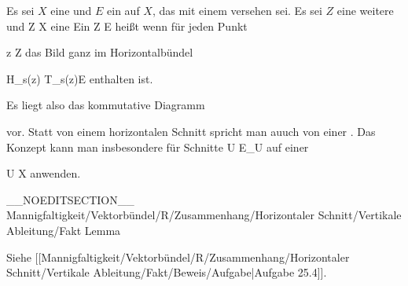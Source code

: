 \setcounter{section}{25}


{}
{

Es sei $X$ eine
und $E$ ein
auf $X$, das mit einem
versehen sei. Es sei $Z$ eine weitere
und
\maabbdisp {\psi} { Z } { X
} {}
eine
Ein
 { Z } { E
} {}
 {} {}
heißt
wenn für jeden Punkt

\mavergleichskette
{\vergleichskette
{ z
}
{ \in }{ Z
}
{  }{
}
{    }{
}
{   }{
}
}
{}{}{}
das Bild
 ganz im Horizontalbündel

\mavergleichskette
{\vergleichskette
{ H_{s(z)}
}
{ \subseteq }{ T_{s(z)}E
}
{  }{
}
{    }{
}
{   }{
}
}
{}{}{}
enthalten ist.

}

Es liegt also das kommutative Diagramm

 {  }

vor. Statt von einem horizontalen Schnitt spricht man auuch von einer   {.} Das Konzept kann man insbesondere für Schnitte
 { U } { E\vert_U
} {}
auf einer

\mavergleichskette
{\vergleichskette
{ U
}
{ \subseteq }{ X
}
{  }{
}
{    }{
}
{   }{
}
}
{}{}{}
anwenden.

__NOEDITSECTION__
{Mannigfaltigkeit/Vektorbündel/R/Zusammenhang/Horizontaler Schnitt/Vertikale Ableitung/Fakt}
{Lemma}
{}
{

\faktzusatz {}
\faktzusatz {}

 }
{ Siehe [[Mannigfaltigkeit/Vektorbündel/R/Zusammenhang/Horizontaler Schnitt/Vertikale Ableitung/Fakt/Beweis/Aufgabe|Aufgabe 25.4]]. }

